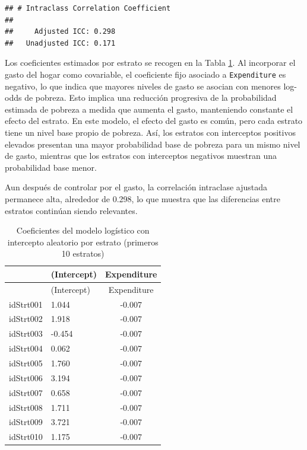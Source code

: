 \documentclass[
  spanish,
  12pt,
]{book}
\newenvironment{Shaded}{\begin{snugshade}}{\end{snugshade}}
\newcommand{\DataTypeTok}[1]{\textcolor[rgb]{0.13,0.29,0.53}{#1}}
\newcommand{\DecValTok}[1]{\textcolor[rgb]{0.00,0.00,0.81}{#1}}
\newcommand{\FunctionTok}[1]{\textcolor[rgb]{0.13,0.29,0.53}{\textbf{#1}}}
\newcommand{\NormalTok}[1]{#1}
\newcommand{\SpecialCharTok}[1]{\textcolor[rgb]{0.81,0.36,0.00}{\textbf{#1}}}
\begin{document}
\begin{verbatim}
## # Intraclass Correlation Coefficient
## 
##     Adjusted ICC: 0.298
##   Unadjusted ICC: 0.171
\end{verbatim}

Los coeficientes estimados por estrato se recogen en la Tabla \ref{tab:tab-coef-logit-int-aleatorio}. Al incorporar el gasto del hogar como covariable, el coeficiente fijo asociado a \texttt{Expenditure} es negativo, lo que indica que mayores niveles de gasto se asocian con menores log-odds de pobreza. Esto implica una reducción progresiva de la probabilidad estimada de pobreza a medida que aumenta el gasto, manteniendo constante el efecto del estrato. En este modelo, el efecto del gasto es común, pero cada estrato tiene un nivel base propio de pobreza. Así, los estratos con interceptos positivos elevados presentan una mayor probabilidad base de pobreza para un mismo nivel de gasto, mientras que los estratos con interceptos negativos muestran una probabilidad base menor.

Aun después de controlar por el gasto, la correlación intraclase ajustada permanece alta, alrededor de 0.298, lo que muestra que las diferencias entre estratos continúan siendo relevantes.

\begin{Shaded}
\end{Shaded}

\begin{longtable}[]{@{}llc@{}}
\caption{\label{tab:tab-coef-logit-int-aleatorio}Coeficientes del modelo logístico con intercepto aleatorio por estrato (primeros 10 estratos)}\tabularnewline
\toprule\noalign{}
& (Intercept) & Expenditure \\
\midrule\noalign{}
\endfirsthead
\toprule\noalign{}
& (Intercept) & Expenditure \\
\midrule\noalign{}
\endhead
\bottomrule\noalign{}
\endlastfoot
idStrt001 & 1.044 & -0.007 \\
idStrt002 & 1.918 & -0.007 \\
idStrt003 & -0.454 & -0.007 \\
idStrt004 & 0.062 & -0.007 \\
idStrt005 & 1.760 & -0.007 \\
idStrt006 & 3.194 & -0.007 \\
idStrt007 & 0.658 & -0.007 \\
idStrt008 & 1.711 & -0.007 \\
idStrt009 & 3.721 & -0.007 \\
idStrt010 & 1.175 & -0.007 \\
\end{longtable}
\end{document}
